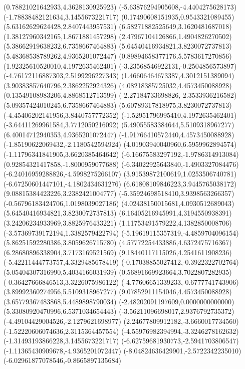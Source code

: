 {(0.78821021642933,4.3628130925923)
(-5.63876294905608,-4.4404275628173)
(-1.78838482121634,3.1455673221717)
(0.17490608151935,0.9543321089455)
(5.63162629624428,2.8407443957531)
(6.58271882525649,3.1620481687018)
(1.38127960342165,1.8671881457298)
(2.47967104126866,1.4904826270502)
(5.38662919638232,6.7358667464883)
(5.64540416934821,3.8230072737813)
(5.48368538789262,4.9365201072447)
(0.89894658377176,5.5783617270856)
(1.92325610520010,4.1972635462401)
(-3.23568546922131,-0.2504856573897)
(-4.76172116887303,2.5199296227343)
(1.46606464673387,4.3012151389094)
(3.90383857640796,2.3862252924326)
(4.08218385725032,4.4573450088928)
(0.13549108983206,4.8868512713599)
(-2.27184733698826,-2.3533936216582)
(5.09357424010245,6.7358667464883)
(5.60789317818975,3.8230072737813)
(-4.45406202141956,3.8440757772352)
(-1.52951796995410,4.1972635462401)
(-3.64411269961584,3.7712050216092)
(5.49055583384644,5.5109318967277)
(6.40014712940353,4.9365201072447)
(-1.91766410572440,4.4573450088928)
(-1.85190622069432,-2.1180542594924)
(4.01903940040960,6.5959962894574)
(-1.11796341841905,3.6620385464642)
(-6.16675583297192,-1.9786314913084)
(0.92854321417858,-1.8000959077688)
(-6.34022925643840,-1.4903327084476)
(-6.24016959288826,-4.5998275266107)
(3.91539872100619,1.0253506740781)
(-6.67250601447101,-4.1802434631276)
(6.61808109846223,3.9445765038172)
(9.08815384423226,3.2382421004777)
(-5.35924698518410,3.9398563266357)
(-0.56796183424706,1.0198039027186)
(4.02438150015681,4.0930512689043)
(5.64540416934821,3.8230072737813)
(6.16405216945991,4.3194550938391)
(3.24206234933969,3.8825976433221)
(1.11753491579222,4.1382850008706)
(-3.57369739172194,1.3382579422794)
(-5.19619115357319,-4.4859704096154)
(5.86251592280386,3.8059626715780)
(4.57772254433886,4.6372475716367)
(6.28680896338904,3.7173169521569)
(9.18440117115026,4.2541611908236)
(-5.42211444773757,4.3329485678419)
(-0.17038855027412,-0.3922322702764)
(5.05404307316990,5.4034166031939)
(0.56891669923664,3.7022807282935)
(-0.36427666846513,3.3226075986122)
(-4.77606651339233,-0.6777741743906)
(3.89992360274956,5.5109318967277)
(9.07852911154046,4.4573450088928)
(3.65779367483868,5.4489898790034)
(-2.48202091197609,0.0000000000000)
(5.33080920470996,6.5371034654443)
(-3.56211096698017,2.9376792735372)
(-4.49104429004526,-2.1279621698977)
(2.24677809912182,-3.6660017734560)
(-1.52220606074636,2.3115364457554)
(-4.55976982394994,-3.3246278162632)
(-1.31493193866228,3.1455673221717)
(-6.62759681930773,-2.5941703806547)
(-1.11365430909678,-4.9365201072447)
(-8.04824636429901,-2.5722342235010)
(-6.02961877078546,-0.8665897135684)
}
